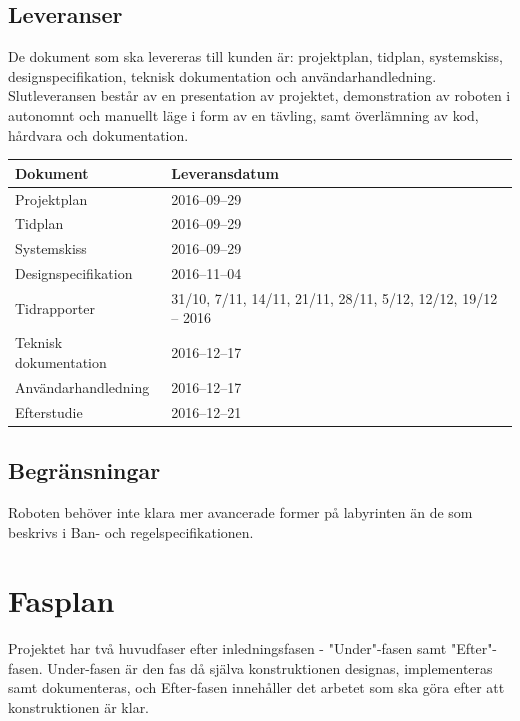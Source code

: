 \documentclass[a4paper,titlepage,12pt]{article}
\begin{document}
	
	\subsection{Leveranser}
	De dokument som ska levereras till kunden är: projektplan, tidplan,
	systemskiss, designspecifikation, teknisk dokumentation och
	användarhandledning. Slutleveransen består av en presentation av projektet,
	demonstration av roboten i autonomnt och manuellt läge i form av en tävling,
	samt överlämning av kod, hårdvara och dokumentation.

	\begin{longtable}[l]{l l}
		\textbf{Dokument} & \textbf{Leveransdatum} \\ \midrule
		
		Projektplan & 2016--09--29 \\ \midrule

		Tidplan & 2016--09--29  \\ \midrule
		
		Systemskiss & 2016--09--29 \\ \midrule

		Designspecifikation & 2016--11--04 \\ \midrule

		Tidrapporter & 31/10, 7/11, 14/11, 21/11, 28/11, 5/12, 12/12, 19/12
                   -- 2016		\\ \midrule

		Teknisk dokumentation & 2016--12--17 \\ \midrule

		Användarhandledning & 2016--12--17 \\ \midrule

		Efterstudie & 2016--12--21  \\ \midrule
	\end{longtable}
	
	
	\subsection{Begränsningar}
	Roboten behöver inte klara mer avancerade former på labyrinten än de som
	beskrivs i Ban- och regelspecifikationen.
	
	
	\section{Fasplan}
    Projektet har två huvudfaser efter inledningsfasen - "Under"-fasen samt
    "Efter"-fasen. Under-fasen är den fas då själva konstruktionen designas, 
    implementeras samt dokumenteras, och Efter-fasen innehåller det arbetet som
    ska göra efter att konstruktionen är klar.
	
\end{document}
